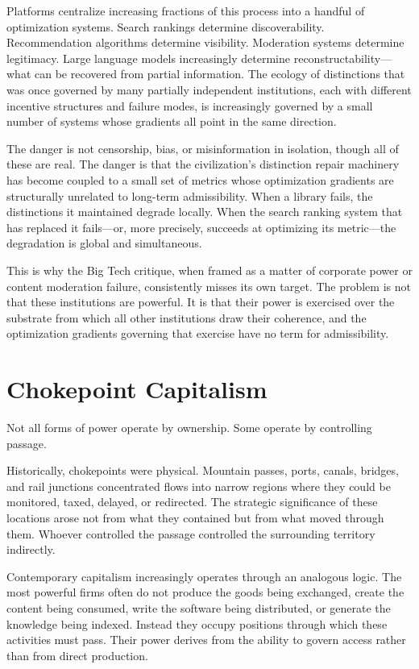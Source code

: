 \documentclass[11pt, letterpaper]{article}
\begin{document}
Platforms centralize increasing fractions of this process into a handful of optimization systems. Search rankings determine discoverability. Recommendation algorithms determine visibility. Moderation systems determine legitimacy. Large language models increasingly determine reconstructability---what can be recovered from partial information. The ecology of distinctions that was once governed by many partially independent institutions, each with different incentive structures and failure modes, is increasingly governed by a small number of systems whose gradients all point in the same direction.

The danger is not censorship, bias, or misinformation in isolation, though all of these are real. The danger is that the civilization's distinction repair machinery has become coupled to a small set of metrics whose optimization gradients are structurally unrelated to long-term admissibility. When a library fails, the distinctions it maintained degrade locally. When the search ranking system that has replaced it fails---or, more precisely, succeeds at optimizing its metric---the degradation is global and simultaneous.

This is why the Big Tech critique, when framed as a matter of corporate power or content moderation failure, consistently misses its own target. The problem is not that these institutions are powerful. It is that their power is exercised over the substrate from which all other institutions draw their coherence, and the optimization gradients governing that exercise have no term for admissibility.

\section{Chokepoint Capitalism}

Not all forms of power operate by ownership. Some operate by controlling passage.

Historically, chokepoints were physical. Mountain passes, ports, canals, bridges, and rail junctions concentrated flows into narrow regions where they could be monitored, taxed, delayed, or redirected. The strategic significance of these locations arose not from what they contained but from what moved through them. Whoever controlled the passage controlled the surrounding territory indirectly.

Contemporary capitalism increasingly operates through an analogous logic. The most powerful firms often do not produce the goods being exchanged, create the content being consumed, write the software being distributed, or generate the knowledge being indexed. Instead they occupy positions through which these activities must pass. Their power derives from the ability to govern access rather than from direct production.
\end{document}
